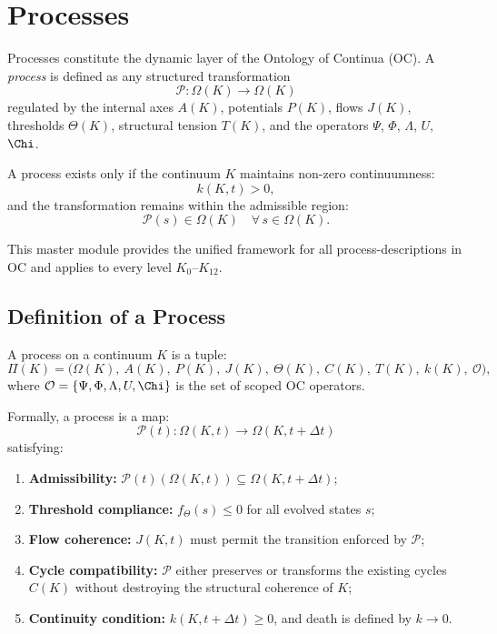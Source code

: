 

\section{Processes}
\label{sec:processes-master}

Processes constitute the dynamic layer of the Ontology of Continua (OC).
A \emph{process} is defined as any structured transformation
\[
\mathcal{P}: \Omega(K) \longrightarrow \Omega(K)
\]
regulated by the internal axes $A(K)$, potentials $P(K)$, flows $J(K)$,
thresholds $\Theta(K)$, structural tension $T(K)$, and the operators
$\Psi$, $\Phi$, $\Lambda$, $U$, $\Chi$.

A process exists only if the continuum $K$ maintains
non-zero continuumness:
\[
k(K,t) > 0,
\]
and the transformation remains within the admissible region:
\[
\mathcal{P}(s) \in \Omega(K) \quad \forall\, s \in \Omega(K).
\]

This master module provides the unified framework for all
process-descriptions in OC and applies to every level $K_0$--$K_{12}$.

\subsection{Definition of a Process}

A process on a continuum $K$ is a tuple:
\[
\Pi(K) =
\bigl(
\Omega(K),\
A(K),\
P(K),\
J(K),\
\Theta(K),\
C(K),\
T(K),\
k(K),\
\mathcal{O}
\bigr),
\]
where $\mathcal{O} = \{\Psi, \Phi, \Lambda, U, \Chi\}$ is the set of
scoped OC operators.

Formally, a process is a map:
\[
\mathcal{P}(t): \Omega(K,t) \to \Omega(K,t+\Delta t)
\]
satisfying:

\begin{enumerate}
    \item \textbf{Admissibility:}
    $\mathcal{P}(t)(\Omega(K,t)) \subseteq \Omega(K,t+\Delta t)$;

    \item \textbf{Threshold compliance:}
    $f_{\Theta}(s) \le 0$ for all evolved states $s$;

    \item \textbf{Flow coherence:}
    $J(K,t)$ must permit the transition enforced by $\mathcal{P}$;

    \item \textbf{Cycle compatibility:}
    $\mathcal{P}$ either preserves or transforms the existing cycles $C(K)$
    without destroying the structural coherence of $K$;

    \item \textbf{Continuity condition:}
    $k(K,t+\Delta t) \ge 0$, and death is defined by $k \to 0$.
\end{enumerate}

